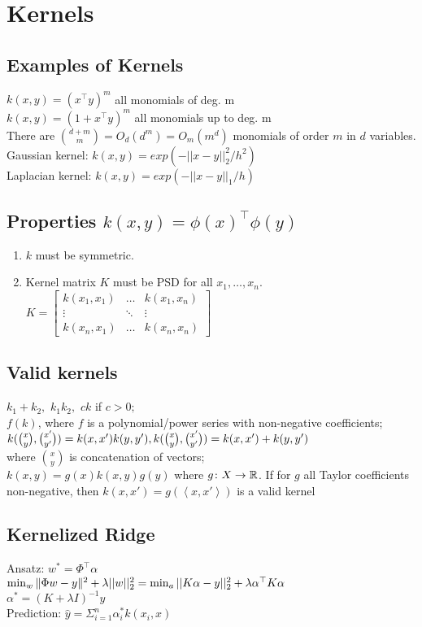 \section*{Kernels}
\subsection*{Examples of Kernels}
$k(x,y) = (x^\top y)^m$  all monomials of deg. m \\
$k(x,y) = (1+x^\top y)^m$ all monomials up to deg. m\\
There are $\binom{d+m}{m}=O_d(d^m)=O_m(m^d)$ monomials of 
order $m$ in $d$ variables.\\
Gaussian kernel: $k(x,y) = exp(-||x-y||_2^2/h^2)$\\
Laplacian kernel: $k(x,y) = exp(-||x-y||_1/h)$


\subsection*{Properties $k(x,y) = \phi(x)^\top \phi(y)$}
\begin{enumerate}[noitemsep,leftmargin=*,topsep=0pt,parsep=0pt,partopsep=0pt]
    \item $k$ must be symmetric.
    \item Kernel matrix $K$ must be PSD for all $x_1,\dots,x_n$.\\
$K=\begin{bmatrix}
    k(x_1,x_1)&\dots&k(x_1,x_n) \\ 
    \vdots&\ddots&\vdots\\
    k(x_n,x_1)&\dots&k(x_n,x_n)
    \end{bmatrix}
$\end{enumerate}

\subsection*{Valid kernels}
$k_1 + k_2,$
$k_1 k_2,$
$  c k$ if $c>0;$\\
$f(k)$, where $f$ is a polynomial/power series with non-negative coefficients;\\
$k(\binom{x}{y}, \binom{x'}{y'})=k(x,x')k(y,y'),\\ 
k(\binom{x}{y}, \binom{x'}{y'})=k(x,x') + k(y,y')$ \\
where $\binom{x}{y}$ is concatenation of vectors;\\
$k(x,y)=g(x)k(x,y)g(y)$ where $g\colon X\to\mathbb{R}$.
If for $g$ all Taylor coefficients non-negative, then $k(x, x') = g(\left< x, x' \right>)$ is a valid kernel

\subsection*{Kernelized Ridge}
Ansatz: $w^*=\Phi^\top\alpha$\\
$\min_w\|\Phi w-y\|^2 + \lambda ||w||_2^2\\
=\min_a ||K\alpha -y||_2^2 + \lambda \alpha^\top K \alpha$\\
$\alpha^*=(K+\lambda I)^{-1} y$\\
Prediction: $\hat{y} = \Sigma_{i=1}^n \alpha_i^* k(x_i,x)$\\